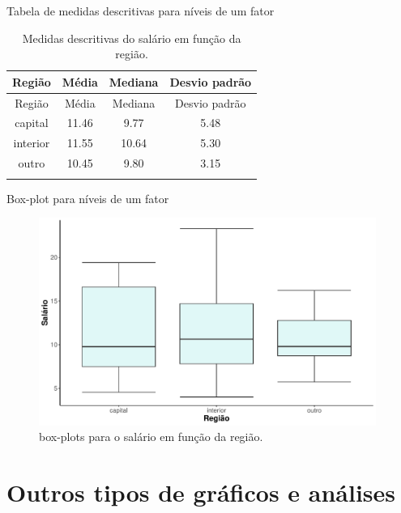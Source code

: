 \documentclass[
  ignorenonframetext,
  serif,
  professionalfont,
  usenames,
  dvipsnames,
  aspectratio = 169]{beamer}
\begin{document}
\begin{frame}{Tabela de medidas descritivas para níveis de um fator}
\label{tabela-de-medidas-descritivas-para-nuxedveis-de-um-fator}
\begin{longtable}[]{@{}cccc@{}}
\caption{Medidas descritivas do salário em função da
região.}\tabularnewline
\toprule\noalign{}
Região & Média & Mediana & Desvio padrão \\
\midrule\noalign{}
\endfirsthead
\toprule\noalign{}
Região & Média & Mediana & Desvio padrão \\
\midrule\noalign{}
\endhead
capital & 11.46 & 9.77 & 5.48 \\
interior & 11.55 & 10.64 & 5.30 \\
outro & 10.45 & 9.80 & 3.15 \\
\bottomrule\noalign{}
\end{longtable}
\end{frame}

\begin{frame}{Box-plot para níveis de um fator}
\label{box-plot-para-nuxedveis-de-um-fator}
\begin{figure}

{\centering \includegraphics[width=11cm]{encontro2_files/figure-beamer/unnamed-chunk-37-1} 

}

\caption{box-plots para o salário em função da região.}\label{fig:unnamed-chunk-37}
\end{figure}
\end{frame}

\section{Outros tipos de gráficos e
análises}\label{outros-tipos-de-gruxe1ficos-e-anuxe1lises}
\end{document}
